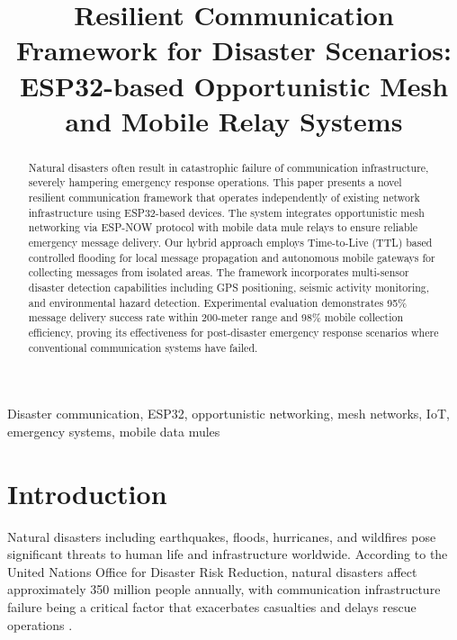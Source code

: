 \documentclass[conference]{IEEEtran}
\begin{document}
\title{Resilient Communication Framework for Disaster Scenarios: ESP32-based Opportunistic Mesh and Mobile Relay Systems}

\author{
}

\maketitle

\begin{abstract}
Natural disasters often result in catastrophic failure of communication infrastructure, severely hampering emergency response operations. This paper presents a novel resilient communication framework that operates independently of existing network infrastructure using ESP32-based devices. The system integrates opportunistic mesh networking via ESP-NOW protocol with mobile data mule relays to ensure reliable emergency message delivery. Our hybrid approach employs Time-to-Live (TTL) based controlled flooding for local message propagation and autonomous mobile gateways for collecting messages from isolated areas. The framework incorporates multi-sensor disaster detection capabilities including GPS positioning, seismic activity monitoring, and environmental hazard detection. Experimental evaluation demonstrates 95\% message delivery success rate within 200-meter range and 98\% mobile collection efficiency, proving its effectiveness for post-disaster emergency response scenarios where conventional communication systems have failed.
\end{abstract}

\begin{IEEEkeywords}
Disaster communication, ESP32, opportunistic networking, mesh networks, IoT, emergency systems, mobile data mules
\end{IEEEkeywords}

\section{Introduction}

Natural disasters including earthquakes, floods, hurricanes, and wildfires pose significant threats to human life and infrastructure worldwide. According to the United Nations Office for Disaster Risk Reduction, natural disasters affect approximately 350 million people annually, with communication infrastructure failure being a critical factor that exacerbates casualties and delays rescue operations \cite{Hassan2017}.
\end{document}
